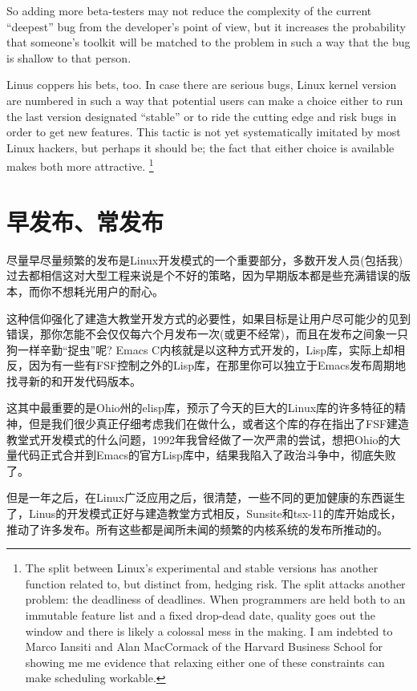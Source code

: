\documentclass[a4paper,12pt,UTF8,twoside]{ctexbook}
\begin{document}
So adding more beta-testers may not reduce the complexity of the current ``deepest'' bug from the developer's point of view, but it increases the probability that someone's toolkit will be matched to the problem in such a way that the bug is shallow to that person.

Linus coppers his bets, too. In case there are serious bugs, Linux kernel version are numbered in such a way that potential users can make a choice either to run the last version designated ``stable'' or to ride the cutting edge and risk bugs in order to get new features. This tactic is not yet systematically imitated by most Linux hackers, but perhaps it should be; the fact that either choice is available makes both more attractive. \footnote{The split between Linux's experimental and stable versions has another function related to, but distinct from, hedging risk. The split attacks another problem: the deadliness of deadlines. When programmers are held both to an immutable feature list and a fixed drop-dead date, quality goes out the window and there is likely a colossal mess in the making. I am indebted to Marco Iansiti and Alan MacCormack of the Harvard Business School for showing me me evidence that relaxing either one of these constraints can make scheduling workable.}

\chapter{早发布、常发布}

尽量早尽量频繁的发布是Linux开发模式的一个重要部分，多数开发人员(包括我)过去都相信这对大型工程来说是个不好的策略，因为早期版本都是些充满错误的版本，而你不想耗光用户的耐心。

这种信仰强化了建造大教堂开发方式的必要性，如果目标是让用户尽可能少的见到错误，那你怎能不会仅仅每六个月发布一次(或更不经常)，而且在发布之间象一只狗一样辛勤“捉虫”呢? Emacs C内核就是以这种方式开发的，Lisp库，实际上却相反，因为有一些有FSF控制之外的Lisp库，在那里你可以独立于Emacs发布周期地找寻新的和开发代码版本。


这其中最重要的是Ohio州的elisp库，预示了今天的巨大的Linux库的许多特征的精神，但是我们很少真正仔细考虑我们在做什么，或者这个库的存在指出了FSF建造教堂式开发模式的什么问题，1992年我曾经做了一次严肃的尝试，想把Ohio的大量代码正式合并到Emacs的官方Lisp库中，结果我陷入了政治斗争中，彻底失败了。


但是一年之后，在Linux广泛应用之后，很清楚，一些不同的更加健康的东西诞生了，Linus的开发模式正好与建造教堂方式相反，Sunsite和tsx-11的库开始成长，推动了许多发布。所有这些都是闻所未闻的频繁的内核系统的发布所推动的。
\end{document}
